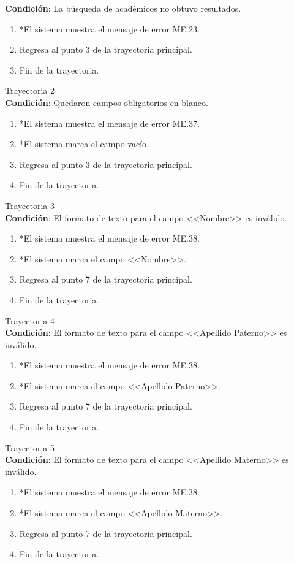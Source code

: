 \textbf{Condición}: La búsqueda de académicos no obtuvo resultados.
\begin{enumerate}
	\item *El sistema muestra el mensaje de error ME.23.
	\item Regresa al punto 3 de la trayectoria principal.
	\item Fin de la trayectoria.
\end{enumerate}
\large{Trayectoria 2}\\
\textbf{Condición}: Quedaron campos obligatorios en blanco.
\begin{enumerate}
	\item *El sistema muestra el mensaje de error ME.37.
	\item *El sistema marca el campo vacío.
	\item Regresa al punto 3 de la trayectoria principal.
	\item Fin de la trayectoria.
\end{enumerate}
\large{Trayectoria 3}\\
\textbf{Condición}: El formato de texto para el campo <<Nombre>> es inválido.
\begin{enumerate}
	\item *El sistema muestra el mensaje de error ME.38.
	\item *El sistema marca el campo <<Nombre>>.
	\item Regresa al punto 7 de la trayectoria principal.
	\item Fin de la trayectoria.
\end{enumerate}
\large{Trayectoria 4}\\
\textbf{Condición}: El formato de texto para el campo <<Apellido Paterno>> es inválido.
\begin{enumerate}
	\item *El sistema muestra el mensaje de error ME.38.
	\item *El sistema marca el campo <<Apellido Paterno>>.
	\item Regresa al punto 7 de la trayectoria principal.
	\item Fin de la trayectoria.
\end{enumerate}
\large{Trayectoria 5}\\
\textbf{Condición}: El formato de texto para el campo <<Apellido Materno>> es inválido.
\begin{enumerate}
	\item *El sistema muestra el mensaje de error ME.38.
	\item *El sistema marca el campo <<Apellido Materno>>.
	\item Regresa al punto 7 de la trayectoria principal.
	\item Fin de la trayectoria.
\end{enumerate}
